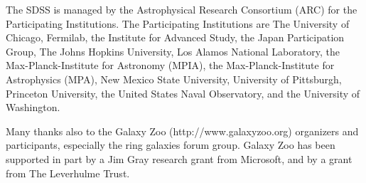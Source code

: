 \documentclass[useAMS,usenatbib]{mn2e}
\begin{document}
The SDSS is managed by the Astrophysical Research Consortium (ARC)
for the Participating Institutions. The Participating Institutions
are The University of Chicago, Fermilab, the Institute for
Advanced Study, the Japan Participation Group, The Johns Hopkins
University, Los Alamos National Laboratory, the
Max-Planck-Institute for Astronomy (MPIA), the
Max-Planck-Institute for Astrophysics (MPA), New Mexico State
University, University of Pittsburgh, Princeton University, the
United States Naval Observatory, and the University of Washington.

Many thanks also to the Galaxy Zoo (http://www.galaxyzoo.org) organizers and participants, especially
the  ring galaxies forum group. Galaxy Zoo has been supported in part by a Jim Gray research grant from
Microsoft, and by a grant from The Leverhulme Trust.
\end{document}

